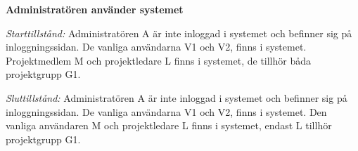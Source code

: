 \documentclass[a4paper]{article}
\begin{document}
\begin{FT}
%

\item \textbf{Administratören använder systemet}

\emph{Starttillstånd:} Administratören A är inte inloggad i systemet och befinner sig på inloggningssidan. De vanliga användarna V1 och V2, finns i systemet. Projektmedlem M och projektledare L finns i systemet, de tillhör båda projektgrupp G1.

\emph{Sluttillstånd:} Administratören A är inte inloggad i systemet och befinner sig på inloggningssidan. De vanliga användarna V1 och V2, finns i systemet. Den vanliga användaren M och projektledare L finns i systemet, endast L tillhör projektgrupp G1.


\end{FT}
\end{document}
